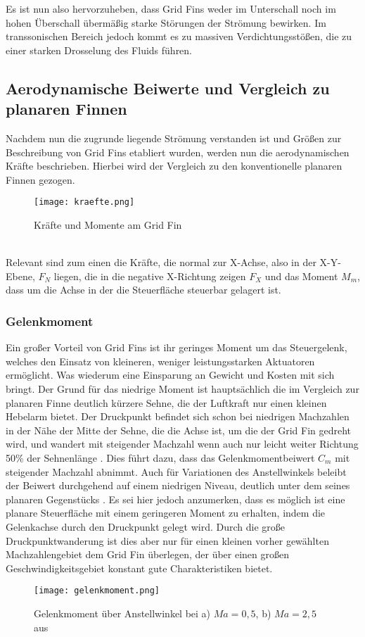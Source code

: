 Es ist nun also hervorzuheben, dass Grid Fins weder im Unterschall noch im hohen Überschall übermäßig starke Störungen der Strömung bewirken. Im transsonischen Bereich jedoch kommt es zu massiven Verdichtungsstößen, die zu einer starken Drosselung des Fluids führen.
\subsection{Aerodynamische Beiwerte und Vergleich zu planaren Finnen}
Nachdem nun die zugrunde liegende Strömung verstanden ist und Größen zur Beschreibung von Grid Fins etabliert wurden, werden nun die aerodynamischen Kräfte beschrieben. Hierbei wird der Vergleich zu den konventionelle planaren Finnen gezogen.
\begin{figure}[h]
	\centering
	\texttt{[image: kraefte.png]}
	\caption{Kräfte und Momente am Grid Fin}
\end{figure}\\
Relevant sind zum einen die Kräfte, die normal zur X-Achse, also in der X-Y-Ebene, $F_N$ liegen, die in die negative X-Richtung zeigen $F_X$ und das Moment $M_m$, dass um die Achse in der die Steuerfläche steuerbar gelagert ist.
\subsubsection{Gelenkmoment}
Ein großer Vorteil von Grid Fins ist ihr geringes Moment um das Steuergelenk, welches den Einsatz von kleineren, weniger leistungsstarken Aktuatoren ermöglicht. Was wiederum eine Einsparung an Gewicht und Kosten mit sich bringt. Der Grund für das niedrige Moment ist hauptsächlich die im Vergleich zur planaren Finne deutlich kürzere Sehne, die der Luftkraft nur einen kleinen Hebelarm bietet. Der Druckpunkt befindet sich schon bei niedrigen Machzahlen in der Nähe der Mitte der Sehne, die die Achse ist, um die der Grid Fin gedreht wird, und wandert mit steigender Machzahl wenn auch nur leicht weiter Richtung 50\% der Sehnenlänge \cite{vergleichPlanarNATO}. Dies führt dazu, dass das Gelenkmomentbeiwert $C_m$ mit steigender Machzahl abnimmt. Auch für Variationen des Anstellwinkels beleibt der Beiwert durchgehend auf einem niedrigen Niveau, deutlich unter dem seines planaren Gegenstücks \cite{vergleichPlanarNATO}. Es sei hier jedoch anzumerken, dass es möglich ist eine planare Steuerfläche mit einem geringeren Moment zu erhalten, indem die Gelenkachse durch den Druckpunkt gelegt wird. Durch die große Druckpunktwanderung ist dies aber nur für einen kleinen vorher gewählten Machzahlengebiet dem Grid Fin überlegen, der über einen großen Geschwindigkeitsgebiet konstant gute Charakteristiken bietet.
\begin{figure}[h]
	\centering
	\texttt{[image: gelenkmoment.png]}
	\caption{Gelenkmoment über Anstellwinkel bei a) \ensuremath{Ma=0,5}, b) $Ma=2,5$ aus \cite{vergleichPlanar}}
\end{figure}\\
